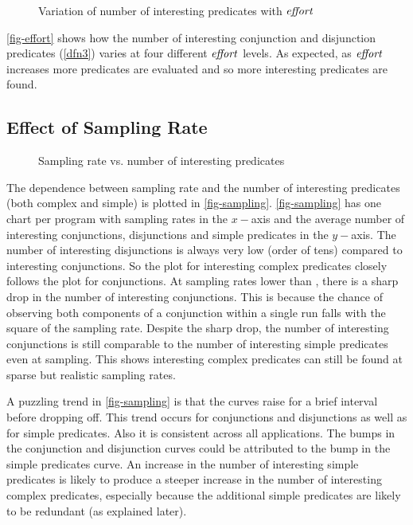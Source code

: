 \begin{figure}
  \centering
  \hfill
  \caption{Variation of number of interesting predicates with $\mathit{effort}$}
  \label{fig-effort}
\end{figure}

\autoref{fig-effort} shows how the number of interesting conjunction and disjunction predicates (\autoref{dfn3}) varies at four different $\mathit{effort}$ levels.  As expected, as $\mathit{effort}$ increases more predicates are evaluated and so more interesting predicates are found.

\subsection{Effect of Sampling Rate}
\label{sec-sampling}

\begin{figure}
  \centering
  \newcommand{\plot}[2]{\subfloat[\prog{#1}]{\texttt{[image: charts/sampling-\#2]}}}
  
  \caption{Sampling rate vs. number of interesting predicates}
  \label{fig-sampling}
\end{figure}

The dependence between sampling rate and the number of interesting predicates (both complex and simple) is plotted in \autoref{fig-sampling}.  \autoref{fig-sampling} has one chart per program with sampling rates in the $x-$axis and the average number of interesting conjunctions, disjunctions and simple predicates in the $y-$axis.  The number of interesting disjunctions is always very low (order of tens) compared to interesting conjunctions.  So the plot for interesting complex predicates closely follows the plot for conjunctions.  At sampling rates lower than , there is a sharp drop in the number of interesting conjunctions.  This is because the chance of observing both components of a conjunction within a single run falls with the square of the sampling rate.  Despite the sharp drop, the number of interesting conjunctions is still comparable to the number of interesting simple predicates even at  sampling.  This shows interesting complex predicates can still be found at sparse but realistic sampling rates.

A puzzling trend in \autoref{fig-sampling} is that the curves raise for a 
brief interval before dropping off.  This trend occurs for conjunctions and 
disjunctions as well as for simple predicates.  Also it is consistent across
all applications.  The bumps in the conjunction and disjunction curves could
be attributed to the bump in the simple predicates curve.  An increase
in the number of interesting simple predicates is likely to produce a steeper 
increase in the number of interesting complex predicates, especially because
the additional simple predicates are likely to be redundant (as explained
later).


